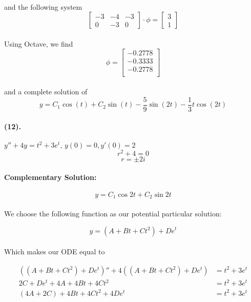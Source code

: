 \documentclass{article}
\begin{document}
\paragraph{}and the following system
\[
  \begin{bmatrix}
    -3 & -4 & -3\\
    0 & -3 & 0
  \end{bmatrix} 
  \cdot \phi
  = 
  \begin{bmatrix}
    3 \\ 1
  \end{bmatrix}
\]
\paragraph{}Using Octave, we find
\[
    \phi = 
  \begin{bmatrix}
       -0.2778\\
  -0.3333\\
    -0.2778\\ 
  \end{bmatrix} 
\]
\paragraph{}and a complete solution of
\[
    y = C_1\cos(t) + C_2\sin(t)-\frac{5}{9}\sin(2t)-\frac{1}{3}t\cos(2t) 
\]

\paragraph{(12).} $y''+4y=t^2+3e^t,\, y(0)=0, y'(0)=2$
\[
    r^2 + 4 = 0
\]
\[
   r = \pm2i 
\]
\paragraph{Complementary Solution:}
\[
  y = C_1 \cos2t + C_2 \sin2t 
\]
\paragraph{}We choose the following function as our potential particular solution:

\[
    y = (A + Bt + Ct^2) + De^{t} 
\]
\paragraph{}Which makes our ODE equal to

\begin{align*}
    ((A + Bt + Ct^2) + De^{t})'' + 4((A + Bt + Ct^2) + De^{t}) &= t^2 + 3e^t\\
    2C + De^t + 4A + 4Bt + 4Ct^2 &= t^2 + 3e^t\\
    (4A + 2C) + 4Bt + 4Ct^2 + 4De^t &= t^2 + 3e^t\\
\end{align*}
\end{document}
